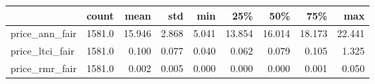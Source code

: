 \begin{tabular}{lrrrrrrrr}
\toprule
{} &   count &    mean &    std &    min &     25\% &     50\% &     75\% &     max \\
\midrule
price\_ann\_fair  &  1581.0 &  15.946 &  2.868 &  5.041 &  13.854 &  16.014 &  18.173 &  22.441 \\
price\_ltci\_fair &  1581.0 &   0.100 &  0.077 &  0.040 &   0.062 &   0.079 &   0.105 &   1.325 \\
price\_rmr\_fair  &  1581.0 &   0.002 &  0.005 &  0.000 &   0.000 &   0.000 &   0.001 &   0.050 \\
\bottomrule
\end{tabular}
